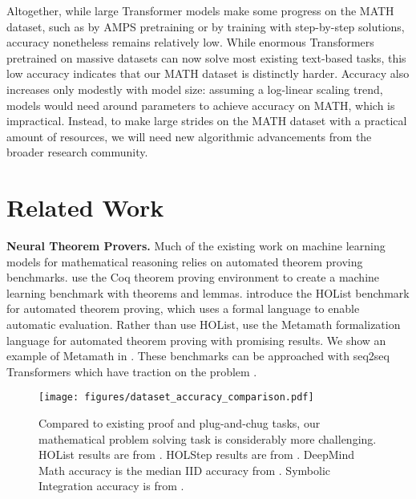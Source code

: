 \documentclass{article}
\begin{document}
Altogether, 
while large Transformer models \citep{Vaswani2017AttentionIA} make some progress on the MATH dataset, such as by AMPS pretraining or by training with step-by-step solutions, accuracy nonetheless remains relatively low.
While enormous Transformers pretrained on massive datasets can now solve most existing text-based tasks, this low accuracy indicates that our MATH dataset is distinctly harder. 
Accuracy also increases only modestly with model size: 
assuming a log-linear scaling trend, models would need around  parameters to achieve  accuracy on MATH, which is impractical. 
Instead, to make large strides on the MATH dataset with a practical amount of resources, we will need new algorithmic advancements from the broader research community.








 \section{Related Work}

\textbf{Neural Theorem Provers.}\quad
Much of the existing work on machine learning models for mathematical reasoning relies on automated theorem proving benchmarks.
\citet{Huang2019GamePadAL} use the Coq theorem proving environment to create a machine learning benchmark with  theorems and lemmas. \citet{Bansal2019HOListAE} introduce the HOList benchmark for automated theorem proving, which uses a formal language to enable automatic evaluation. Rather than use HOList, \citet{Polu2020GenerativeLM} use the Metamath formalization language for automated theorem proving with promising results. We show an example of Metamath in . These benchmarks can be approached with seq2seq \citep{Sutskever2014SequenceTS} Transformers which have traction on the problem \citep{Polu2020GenerativeLM, Rabe2020MathematicalRV, Li2020ModellingHM}.

\begin{wrapfigure}{r}{0.5\textwidth}
    \vspace{-10pt}
    \centering
    \texttt{[image: figures/dataset\_accuracy\_comparison.pdf]}
    \caption{Compared to existing proof and plug-and-chug tasks, our mathematical problem solving task is considerably more challenging. HOList results are from \citet{Wu2021LIMELI}. HOLStep results are from \citet{Crouse2019ImprovingGN}. DeepMind Math accuracy is the median IID accuracy from \citet{Henighan2020ScalingLF}. Symbolic Integration accuracy is from \citet{Lample2020DeepLF}.}
    \label{fig:datasetsacc}
    \vspace{-10pt}
\end{wrapfigure}
\end{document}
